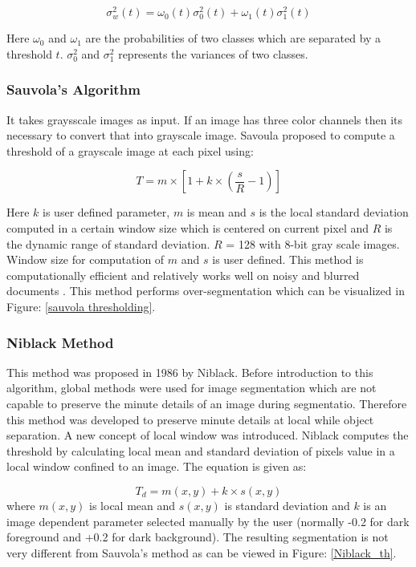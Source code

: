 \documentclass[11pt]{article}
\begin{document}
\begin{equation}
\sigma_{w}^{2}(t)=\omega_{0}(t) \sigma_{0}^{2}(t)+\omega_{1}(t) \sigma_{1}^{2}(t)
\end{equation}

Here $\omega_{0}$ and $\omega_{1}$ are the probabilities of two classes which are separated by a threshold $t$. $\sigma_{0}^{2}$ and $\sigma_{1}^{2}$ represents the variances of two classes.

\subsubsection{Sauvola's Algorithm}
It takes graysscale images as input. If an image has three color channels then its necessary to convert that into grayscale image. Savoula proposed to compute a threshold of a grayscale image at each pixel using:

\begin{equation}
T=m \times\left[1+k \times\left(\frac{s}{R}-1\right)\right]
\end{equation}

Here $k$ is user defined parameter, $m$ is mean and $s$ is the local standard deviation computed in a certain window size which is centered on current pixel and $R$ is the dynamic range of standard deviation. $R$ = 128 with 8-bit gray scale images. Window size for computation of $m$ and $s$ is user defined. This method is computationally efficient and relatively works well on noisy and blurred documents \cite{szegedy_going_2015}. This method performs over-segmentation which can be visualized in Figure: \ref{sauvola thresholding}.

\subsubsection{Niblack Method}
This method was proposed in 1986 by Niblack. Before introduction to this algorithm, global methods were used for image segmentation which are not capable to preserve the minute details of an image during segmentatio. Therefore this method was developed to preserve minute details at local while object separation. A new concept of local window was introduced. Niblack computes the threshold by calculating local mean and standard deviation of pixels value in a local window confined to an image. The equation is given as:

\begin{equation}
T_{d}=m(x, y)+k \times s(x, y)
\end{equation}
where $m(x, y)$ is local mean and $s(x, y)$ is standard deviation and $k$ is an image dependent parameter selected manually by the user (normally -0.2 for dark foreground and +0.2 for dark background). The resulting segmentation is not very different from Sauvola's method as can be viewed in Figure: \ref{Niblack_th}.
\end{document}
